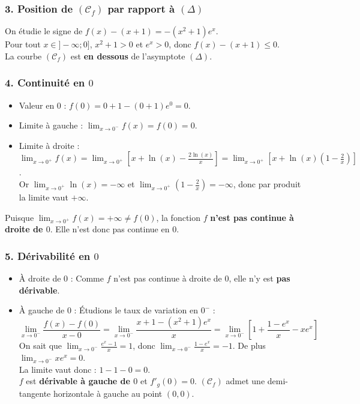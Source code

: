 \documentclass[12pt,a4paper]{article}
\begin{document}
\subsubsection*{3. Position de $(\mathcal{C}_f)$ par rapport à $(\Delta)$}
On étudie le signe de $f(x) - (x+1) = -(x^2+1)e^x$. \\
Pour tout $x \in ]-\infty; 0]$, $x^2+1 > 0$ et $e^x > 0$, donc $f(x) - (x+1) \le 0$. \\
La courbe $(\mathcal{C}_f)$ est \textbf{en dessous} de l'asymptote $(\Delta)$.

\subsubsection*{4. Continuité en $0$}
\begin{itemize}
    \item Valeur en $0$ : $f(0) = 0 + 1 - (0+1)e^0 = 0$.
    \item Limite à gauche : $\lim_{x \to 0^-} f(x) = f(0) = 0$.
    \item Limite à droite : $\lim_{x \to 0^+} f(x) = \lim_{x \to 0^+} \left[ x + \ln(x) - \frac{2\ln(x)}{x} \right] = \lim_{x \to 0^+} \left[ x + \ln(x)\left(1 - \frac{2}{x}\right) \right]$. \\
    Or $\lim_{x \to 0^+} \ln(x) = -\infty$ et $\lim_{x \to 0^+} \left(1 - \frac{2}{x}\right) = -\infty$, donc par produit la limite vaut $+\infty$.
\end{itemize}
Puisque $\lim_{x \to 0^+} f(x) = +\infty \neq f(0)$, la fonction $f$ \textbf{n'est pas continue à droite de $0$}. Elle n'est donc pas continue en $0$.

\subsubsection*{5. Dérivabilité en $0$}
\begin{itemize}
    \item À droite de $0$ : Comme $f$ n'est pas continue à droite de $0$, elle n'y est \textbf{pas dérivable}.
    \item À gauche de $0$ : Étudions le taux de variation en $0^-$ :
    \[ \lim_{x \to 0^-} \frac{f(x) - f(0)}{x-0} = \lim_{x \to 0^-} \frac{x + 1 - (x^2+1)e^x}{x} = \lim_{x \to 0^-} \left[ 1 + \frac{1 - e^x}{x} - xe^x \right] \]
    On sait que $\lim_{x \to 0^-} \frac{e^x - 1}{x} = 1$, donc $\lim_{x \to 0^-} \frac{1 - e^x}{x} = -1$. De plus $\lim_{x \to 0^-} xe^x = 0$. \\
    La limite vaut donc : $1 - 1 - 0 = 0$. \\
    $f$ est \textbf{dérivable à gauche de $0$} et $f'_g(0) = 0$. $(\mathcal{C}_f)$ admet une demi-tangente horizontale à gauche au point $(0,0)$.
\end{itemize}
\end{document}
